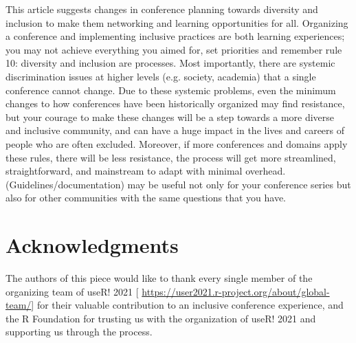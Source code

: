 \documentclass[10pt,letterpaper]{article}
\begin{document}
This article suggests changes in conference planning towards diversity and inclusion to make them networking and learning opportunities for all. 
Organizing a conference and implementing inclusive practices are both learning experiences;
you may not achieve everything you aimed for, set priorities and remember rule 10: diversity and inclusion are processes. 
Most importantly, there are systemic discrimination issues at higher levels (e.g. society, academia) that a single conference cannot change. 
Due to these systemic problems, even the minimum changes to how conferences have been historically organized may find resistance, but your courage to make these changes will be a step towards a more diverse and inclusive community, and can have a huge impact in the lives and careers of people who are often excluded.
Moreover, if more conferences and domains apply these rules, there will be less resistance, the process will get more streamlined, straightforward, and mainstream to adapt with minimal overhead.
(Guidelines/documentation) may be useful not only for your conference series but also for other communities with the same questions that you have. %

\section*{Acknowledgments}
The authors of this piece would like to thank every single member of the organizing team of useR! 2021 [ \url{https://user2021.r-project.org/about/global-team/}] for their valuable contribution to an inclusive conference experience, and the R Foundation for trusting us with the organization of useR! 2021 and supporting us through the process. 








\end{document}

